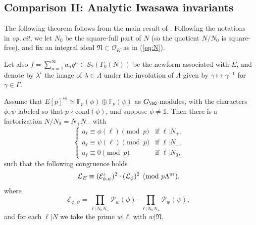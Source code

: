 \subsection{Comparison II: Analytic Iwasawa invariants}


The following theorem follows from the main result of \cite{kriz}. Following the notations in \emph{op.\,cit},
we let $N_0$ be the square-full part of $N$ (so the quotient $N/N_0$ is square-free), and fix an integral ideal $\mathfrak{N}\subset\mathcal{O}_K$ as in (\ref{eq:N}).

Let also $f=\sum_{n=1}^\infty a_nq^n\in S_2(\Gamma_0(N))$ be the newform associated with $E$, and denote by $\lambda^\iota$ the image of $\lambda\in\Lambda$ under the involution of $\Lambda$ given by $\gamma\mapsto\gamma^{-1}$ for $\gamma\in\Gamma$.


\begin{theorem}
\notready\label{thm:kriz}
Assume that $E[p]^{ss}\simeq\mathbb{F}_p(\phi)\oplus\mathbb{F}_p(\psi)$ as $G_\bQ$-modules,
with the characters $\phi, \psi$ labeled so that $p\nmid\mathrm{cond}(\phi)$, and suppose $\phi\neq\mathds{1}$.
Then there is a factorization $N/N_0=N_+N_-$ with
\[
\begin{cases}
a_\ell\equiv\phi(\ell)\pmod{p}&\textrm{if $\ell\vert N_+$,}\\
a_\ell\equiv\psi(\ell)\pmod{p}&\textrm{if $\ell\vert N_-$,}\\
a_\ell\equiv 0\pmod{p}&\textrm{if $\ell\vert N_0,$}
\end{cases}
\]
such that the following congruence holds
\[
\mathcal{L}_E\equiv(\mathcal{E}_{\phi,\psi}^\iota)^2\cdot(\mathcal{L}_\phi)^2\pmod{p\Lambda^{\rm ur}},
\]
where
\[
\mathcal{E}_{\phi,\psi}=\prod_{\ell\vert N_0N_-}\mathcal{P}_w(\phi)\cdot\prod_{\ell\vert N_0N_+}\mathcal{P}_w(\psi),
\]
and for each $\ell\vert N$ we take the prime $w\vert\ell$ with $w\vert\mathfrak{N}$.
\end{theorem}

